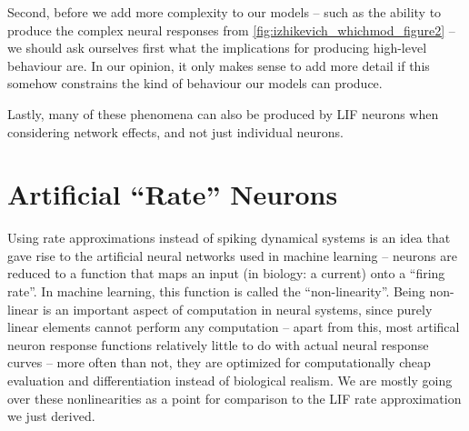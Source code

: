 \documentclass[10pt,letterpaper,oneside]{article}
\begin{document}
Second, before we add more complexity to our models -- such as the ability to produce the complex neural responses from \cref{fig:izhikevich_whichmod_figure2} -- we should ask ourselves first what the implications for producing high-level behaviour are. In our opinion, it only makes sense to add more detail if this somehow constrains the kind of behaviour our models can produce.

Lastly, many of these phenomena can also be produced by LIF neurons when considering network effects, and not just individual neurons.

\newpage


\section{Artificial \enquote{Rate} Neurons}

Using rate approximations instead of spiking dynamical systems is an idea that gave rise to the artificial neural networks used in machine learning -- neurons are reduced to a function that maps an input (in biology: a current) onto a \enquote{firing rate}. In machine learning, this function is called the \enquote{non-linearity}. Being non-linear is an important aspect of computation in neural systems, since purely linear elements cannot perform any computation -- apart from this, most artifical neuron response functions relatively little to do with actual neural response curves --  more often than not, they are optimized for computationally cheap evaluation and differentiation instead of biological realism. We are mostly going over these nonlinearities as a point for comparison to the LIF rate approximation we just derived.

\end{document}
